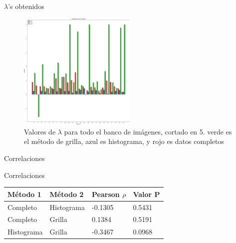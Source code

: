 \documentclass{beamer}
\begin{document}
\begin{frame}{$\lambda$'s obtenidos}
    \begin{figure}[H]
        \centering
        \includegraphics[width=0.5\textwidth]{lambda_clip.png}
        \caption{Valores de $\lambda$ para todo el banco de im\'agenes, cortado en 5. verde es el m\'etodo de grilla, azul es histograma, y rojo es datos completos}
        \label{fig:lambda_clip}
    \end{figure}
\end{frame}


\begin{frame}{Correlaciones}
    \begin{block}{Correlaciones}
        
        \begin{table}[H]
            \centering
            \begin{tabular}{|l|l|l|l|}
                \hline
                M\'etodo 1 & M\'etodo 2 & Pearson $\rho$ & Valor P \\ \hline
                Completo                  & Histograma                & -0.1305   & 0.5431  \\ 
                Completo                  & Grilla                    & 0.1384    & 0.5191  \\ 
                Histograma                & Grilla                    & -0.3467   & 0.0968  \\ \hline
            \end{tabular}
        \end{table}
    \end{block}
\end{frame}
\end{document}

